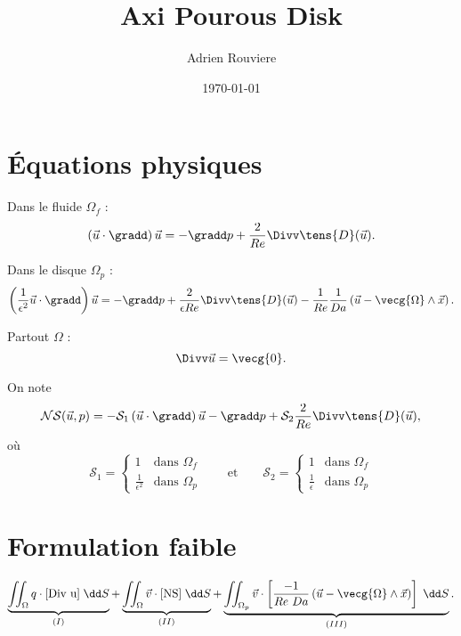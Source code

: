 \documentclass[article,11pt,a4paper,nomtoc]{LaRouviereClasse}
\title{Axi Pourous Disk}
\author{Adrien Rouviere}
\date{\today}
\begin{document}

\section{Équations physiques}

Dans le fluide $\Omega_f$ :
\begin{equation}
	\left(\vec{u}\cdot\gradd\right)\vec{u} = -\gradd p + \dfrac{2}{Re}\Divv\tens{D}(\vec{u}).
	\label{Fluide}
\end{equation}

Dans le disque $\Omega_p$ :
\begin{equation}
	\left(\dfrac{1}{\epsilon^2}\vec{u}\cdot\gradd\right)\vec{u} = -\gradd p + \dfrac{2}{\epsilon Re}\Divv\tens{D}(\vec{u}) - \dfrac{1}{Re}\dfrac{1}{Da}\left(\vec{u}-\vecg{\Omega}\wedge\vec{x}\right).
	\label{Poreux}
\end{equation}

Partout $\Omega$ :
\begin{equation}
	\Divv\vec{u} = \vecg{0}.
	\label{Div u}
\end{equation}

On note
\begin{equation}
	\mathcal{NS}(\vec{u},p) = -\mathcal{S}_1\left(\vec{u}\cdot\gradd\right)\vec{u} - \gradd p + \mathcal{S}_2\dfrac{2}{Re}\Divv\tens{D}(\vec{u}),
	\label{NS}
\end{equation}
où
\begin{equation}
\mathcal{S}_1 =
\begin{cases}
	1						& \text{dans }\Omega_f \\
	\frac{1}{\epsilon^2}	& \text{dans }\Omega_p
\end{cases}
\qquad\text{et}\qquad
\mathcal{S}_2 =
\begin{cases}
	1						& \text{dans }\Omega_f \\
	\frac{1}{\epsilon}		& \text{dans }\Omega_p
\end{cases}
\end{equation}

\section{Formulation faible}

\begin{equation}
	\underbrace{\iint_\Omega{q\cdot\eqref{Div u}\;\dd S}}_{(I)} + \underbrace{\iint_\Omega{\vec{v}\cdot\eqref{NS}}\;\dd S}_{(II)} + \underbrace{\iint_{\Omega_p}{\vec{v}\cdot\left[\dfrac{-1}{Re\ Da}\left(\vec{u}-\vecg{\Omega}\wedge\vec{x}\right)\right]\;\dd S}}_{(III)}.
\end{equation}
\end{document}
